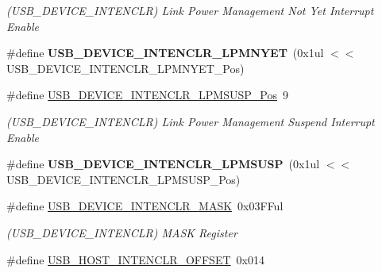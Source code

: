 \begin{DoxyCompactItemize}
\begin{DoxyCompactList}\small\item\em (U\+S\+B\+\_\+\+D\+E\+V\+I\+C\+E\+\_\+\+I\+N\+T\+E\+N\+C\+L\+R) Link Power Management Not Yet Interrupt Enable \end{DoxyCompactList}\item 
\hypertarget{group___s_a_m_l21___u_s_b_ga8fe5f088c564c645eae7f85dfc3b1435}{}\#define {\bfseries U\+S\+B\+\_\+\+D\+E\+V\+I\+C\+E\+\_\+\+I\+N\+T\+E\+N\+C\+L\+R\+\_\+\+L\+P\+M\+N\+Y\+E\+T}~(0x1ul $<$$<$ U\+S\+B\+\_\+\+D\+E\+V\+I\+C\+E\+\_\+\+I\+N\+T\+E\+N\+C\+L\+R\+\_\+\+L\+P\+M\+N\+Y\+E\+T\+\_\+\+Pos)\label{group___s_a_m_l21___u_s_b_ga8fe5f088c564c645eae7f85dfc3b1435}

\item 
\hypertarget{group___s_a_m_l21___u_s_b_ga76ddac563814b550b242b8d1b80e52ae}{}\#define \hyperlink{group___s_a_m_l21___u_s_b_ga76ddac563814b550b242b8d1b80e52ae}{U\+S\+B\+\_\+\+D\+E\+V\+I\+C\+E\+\_\+\+I\+N\+T\+E\+N\+C\+L\+R\+\_\+\+L\+P\+M\+S\+U\+S\+P\+\_\+\+Pos}~9\label{group___s_a_m_l21___u_s_b_ga76ddac563814b550b242b8d1b80e52ae}

\begin{DoxyCompactList}\small\item\em (U\+S\+B\+\_\+\+D\+E\+V\+I\+C\+E\+\_\+\+I\+N\+T\+E\+N\+C\+L\+R) Link Power Management Suspend Interrupt Enable \end{DoxyCompactList}\item 
\hypertarget{group___s_a_m_l21___u_s_b_ga82d27acaa4ba337bd8b1b0f1c64fc440}{}\#define {\bfseries U\+S\+B\+\_\+\+D\+E\+V\+I\+C\+E\+\_\+\+I\+N\+T\+E\+N\+C\+L\+R\+\_\+\+L\+P\+M\+S\+U\+S\+P}~(0x1ul $<$$<$ U\+S\+B\+\_\+\+D\+E\+V\+I\+C\+E\+\_\+\+I\+N\+T\+E\+N\+C\+L\+R\+\_\+\+L\+P\+M\+S\+U\+S\+P\+\_\+\+Pos)\label{group___s_a_m_l21___u_s_b_ga82d27acaa4ba337bd8b1b0f1c64fc440}

\item 
\hypertarget{group___s_a_m_l21___u_s_b_gaefcb7f6254cde2c107efd41e6e8d848a}{}\#define \hyperlink{group___s_a_m_l21___u_s_b_gaefcb7f6254cde2c107efd41e6e8d848a}{U\+S\+B\+\_\+\+D\+E\+V\+I\+C\+E\+\_\+\+I\+N\+T\+E\+N\+C\+L\+R\+\_\+\+M\+A\+S\+K}~0x03\+F\+Ful\label{group___s_a_m_l21___u_s_b_gaefcb7f6254cde2c107efd41e6e8d848a}

\begin{DoxyCompactList}\small\item\em (U\+S\+B\+\_\+\+D\+E\+V\+I\+C\+E\+\_\+\+I\+N\+T\+E\+N\+C\+L\+R) M\+A\+S\+K Register \end{DoxyCompactList}\item 
\hypertarget{group___s_a_m_l21___u_s_b_ga983e7382991bf41fd9855065ed22cf50}{}\#define \hyperlink{group___s_a_m_l21___u_s_b_ga983e7382991bf41fd9855065ed22cf50}{U\+S\+B\+\_\+\+H\+O\+S\+T\+\_\+\+I\+N\+T\+E\+N\+C\+L\+R\+\_\+\+O\+F\+F\+S\+E\+T}~0x014\label{group___s_a_m_l21___u_s_b_ga983e7382991bf41fd9855065ed22cf50}


\end{DoxyCompactItemize}
